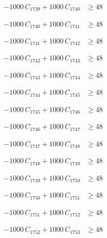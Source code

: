 \documentclass[a4paper,11pt]{article}
\begin{document}
\begin{align}
-1000\,C_{1739} + 1000\,C_{1740} &\geq 48 \nonumber
\end{align}

\begin{align}
-1000\,C_{1740} + 1000\,C_{1741} &\geq 48 \nonumber
\end{align}

\begin{align}
-1000\,C_{1741} + 1000\,C_{1742} &\geq 48 \nonumber
\end{align}

\begin{align}
-1000\,C_{1742} + 1000\,C_{1743} &\geq 48 \nonumber
\end{align}

\begin{align}
-1000\,C_{1743} + 1000\,C_{1744} &\geq 48 \nonumber
\end{align}

\begin{align}
-1000\,C_{1744} + 1000\,C_{1745} &\geq 48 \nonumber
\end{align}

\begin{align}
-1000\,C_{1745} + 1000\,C_{1746} &\geq 48 \nonumber
\end{align}

\begin{align}
-1000\,C_{1746} + 1000\,C_{1747} &\geq 48 \nonumber
\end{align}

\begin{align}
-1000\,C_{1747} + 1000\,C_{1748} &\geq 48 \nonumber
\end{align}

\begin{align}
-1000\,C_{1748} + 1000\,C_{1749} &\geq 48 \nonumber
\end{align}

\begin{align}
-1000\,C_{1749} + 1000\,C_{1750} &\geq 48 \nonumber
\end{align}

\begin{align}
-1000\,C_{1750} + 1000\,C_{1751} &\geq 48 \nonumber
\end{align}

\begin{align}
-1000\,C_{1751} + 1000\,C_{1752} &\geq 48 \nonumber
\end{align}

\begin{align}
-1000\,C_{1752} + 1000\,C_{1753} &\geq 48 \nonumber
\end{align}
\end{document}

